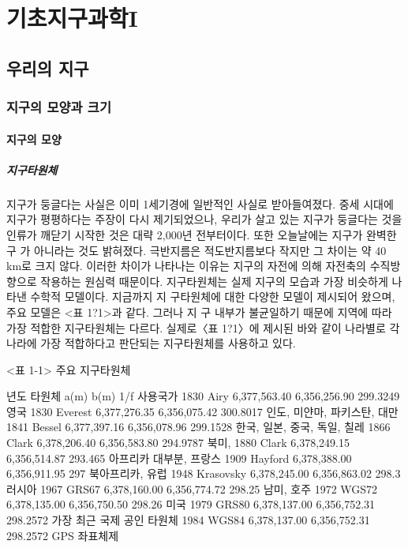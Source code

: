 \part{기초지구과학I}

\usechapterimagetrue

\chapter{우리의 지구}

\section{지구의 모양과 크기}

\subsection{지구의 모양}

\subsubsection{지구타원체}

지구가 둥글다는 사실은 이미 1세기경에 일반적인 사실로 받아들여졌다. 중세 시대에 지구가 평평하다는 주장이 다시 제기되었으나, 우리가 살고 있는 지구가 둥글다는 것을 인류가 깨닫기 시작한 것은 대략 2,000년 전부터이다. 또한 오늘날에는 지구가 완벽한 구 가 아니라는 것도 밝혀졌다. 극반지름은 적도반지름보다 작지만 그 차이는 약 40 km로 크지 않다. 이러한 차이가 나타나는 이유는 지구의 자전에 의해 자전축의 수직방향으로 작용하는 원심력 때문이다.
지구타원체는 실제 지구의 모습과 가장 비슷하게 나타낸 수학적 모델이다. 지금까지 지 구타원체에 대한 다양한 모델이 제시되어 왔으며, 주요 모델은 <표 1?1>과 같다. 그러나 지 구 내부가 불균일하기 때문에 지역에 따라 가장 적합한 지구타원체는 다르다. 실제로〈표 1?1〉에 제시된 바와 같이 나라별로 각 나라에 가장 적합하다고 판단되는 지구타원체를 사용하고 있다.


<표 1-1> 주요 지구타원체

년도
타원체
a(m)
b(m)
1/f
사용국가
1830
Airy
6,377,563.40
6,356,256.90
299.3249
영국
1830
Everest
6,377,276.35
6,356,075.42
300.8017
인도, 미얀마, 파키스탄, 대만
1841
Bessel
6,377,397.16
6,356,078.96
299.1528
한국, 일본, 중국, 독일, 칠레
1866
Clark
6,378,206.40
6,356,583.80
294.9787
북미,
1880
Clark
6,378,249.15
6,356,514.87
293.465
아프리카 대부분, 프랑스
1909
Hayford
6,378,388.00
6,356,911.95
297
북아프리카, 유럽
1948
Krasovsky
6,378,245.00
6,356,863.02
298.3
러시아
1967
GRS67
6,378,160.00
6,356,774.72
298.25
남미, 호주
1972
WGS72
6,378,135.00
6,356,750.50
298.26
미국
1979
GRS80
6,378,137.00
6,356,752.31
298.2572
가장 최근 국제 공인 타원체
1984
WGS84
6,378,137.00
6,356,752.31
298.2572
GPS 좌표체제


